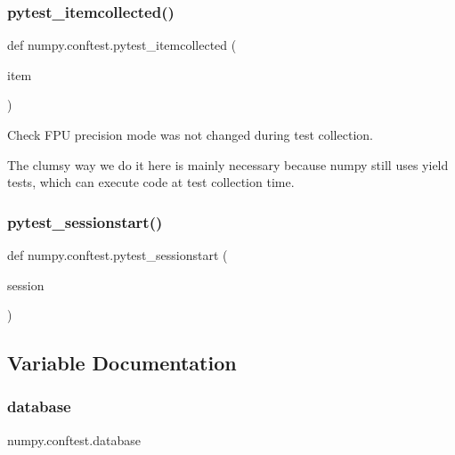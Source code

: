 \subsubsection{\texorpdfstring{pytest\+\_\+itemcollected()}{pytest\_itemcollected()}}
{\footnotesize\ttfamily def numpy.\+conftest.\+pytest\+\_\+itemcollected (\begin{DoxyParamCaption}\item[{}]{item }\end{DoxyParamCaption})}

\begin{DoxyVerb}Check FPU precision mode was not changed during test collection.

The clumsy way we do it here is mainly necessary because numpy
still uses yield tests, which can execute code at test collection
time.
\end{DoxyVerb}
 \mbox{\label{namespacenumpy_1_1conftest_a487489337ad4298f7d3e3fdd338d98e4}} 
\subsubsection{\texorpdfstring{pytest\+\_\+sessionstart()}{pytest\_sessionstart()}}
{\footnotesize\ttfamily def numpy.\+conftest.\+pytest\+\_\+sessionstart (\begin{DoxyParamCaption}\item[{}]{session }\end{DoxyParamCaption})}



\subsection{Variable Documentation}
\mbox{\label{namespacenumpy_1_1conftest_a79a25c7ddab5fe79ef8015a7f6fc821a}} 
\subsubsection{\texorpdfstring{database}{database}}
{\footnotesize\ttfamily numpy.\+conftest.\+database}

